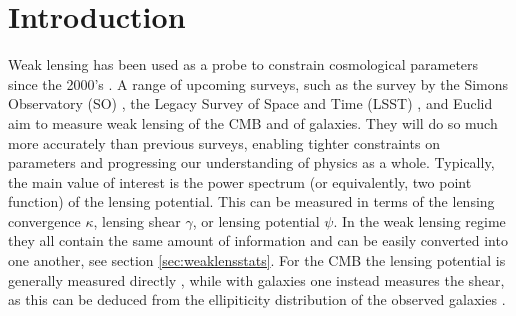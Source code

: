 \documentclass[11pt]{article} %
\begin{document}


\section{Introduction}

Weak lensing has been used as a probe to constrain cosmological parameters since the 2000's \cite{kilbinger2015cosmology,Bacon2000,Kaiser2000,Waerbeke2000,Bartelmann2001}. A range of upcoming surveys, such as the survey by the Simons Observatory (SO) \cite{Ade2019}, the Legacy Survey of Space and Time (LSST) \cite{Ivezic2019}, and Euclid \cite{Laureijs2011} aim to measure weak lensing of the CMB and of galaxies. They will do so much more accurately than previous surveys, enabling tighter constraints on parameters and progressing our understanding of physics as a whole. Typically, the main value of interest is the power spectrum (or equivalently, two point function) of the lensing potential. This can be measured in terms of the lensing convergence $\kappa$, lensing shear $\gamma$, or lensing potential $\psi$. In the weak lensing regime they all contain the same amount of information and can be easily converted into one another, see section \ref{sec:weaklensstats}. For the CMB the lensing potential is generally measured directly \cite{Planck2018Lensing}, while with galaxies one instead measures the shear, as this can be deduced from the ellipiticity distribution of the observed galaxies \cite{HoekstraJain2008}.
\end{document}
